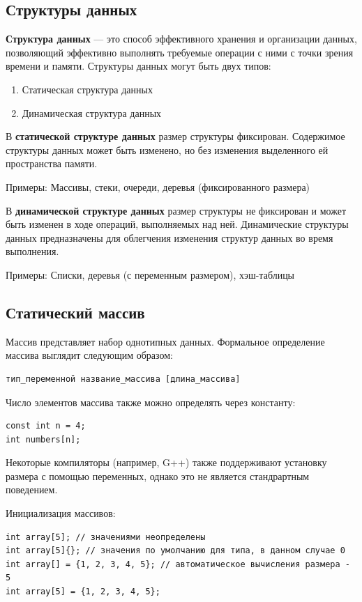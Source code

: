 \subsection{Структуры данных}

\textbf{Структура данных} — это способ эффективного хранения и организации данных, позволяющий эффективно выполнять требуемые операции с ними с точки зрения времени и памяти. Структуры данных могут быть двух типов:
\begin{enumerate}
    \item Статическая структура данных
    \item Динамическая структура данных
\end{enumerate}

В \textbf{статической структуре данных} размер структуры фиксирован. Содержимое структуры данных может быть изменено, но без изменения выделенного ей пространства памяти.

Примеры: Массивы, стеки, очереди, деревья (фиксированного размера)

В \textbf{динамической структуре данных} размер структуры не фиксирован и может быть изменен в ходе операций, выполняемых над ней. Динамические структуры данных предназначены для облегчения изменения структур данных во время выполнения.

Примеры: Списки, деревья (с переменным размером), хэш-таблицы

\subsection{Статический массив}

Массив представляет набор однотипных данных. Формальное определение массива выглядит следующим образом:

\begin{verbatim}
тип_переменной название_массива [длина_массива]
\end{verbatim}

Число элементов массива также можно определять через константу:

\begin{verbatim}
const int n = 4;
int numbers[n];
\end{verbatim}

Некоторые компиляторы (например, G++) также поддерживают установку размера с помощью переменных, однако это не является стандрартным поведением.

Инициализация массивов:
\begin{verbatim}
int array[5]; // значениями неопределены
int array[5]{}; // значения по умолчанию для типа, в данном случае 0
int array[] = {1, 2, 3, 4, 5}; // автоматическое вычисления размера - 5
int array[5] = {1, 2, 3, 4, 5};
\end{verbatim}

